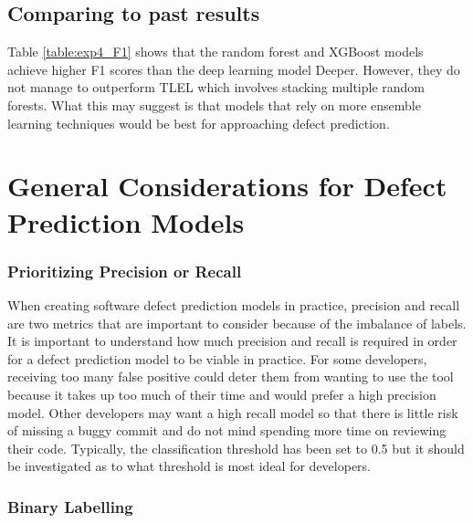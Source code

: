 \documentclass[../main.tex]{subfiles}
\begin{document}
\subsection{Comparing to past results}

Table \ref{table:exp4_F1} shows that the random forest and XGBoost models achieve higher F1 scores than the deep learning model Deeper. However, they do not manage to outperform TLEL which involves stacking multiple random forests. What this may suggest is that models that rely on more ensemble learning techniques would be best for approaching defect prediction. 

\section{General Considerations for Defect Prediction Models}

\subsubsection{Prioritizing Precision or Recall}

When creating software defect prediction models in practice, precision and recall are two metrics that are important to consider because of the imbalance of labels. It is important to understand how much precision and recall is required in order for a defect prediction model to be viable in practice. For some developers, receiving too many false positive could deter them from wanting to use the tool because it takes up too much of their time and would prefer a high precision model. Other developers may want a high recall model so that there is little risk of missing a buggy commit and do not mind spending more time on reviewing their code. Typically, the classification threshold has been set to 0.5 but it should be investigated as to what threshold is most ideal for developers. 

\subsubsection{Binary Labelling}
\end{document}
